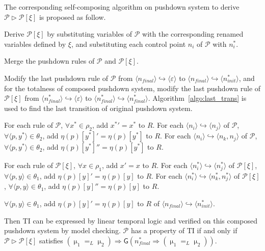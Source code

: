 \documentclass{llncs}
\begin{document}
The corresponding self-composing algorithm on pushdown system to
derive $\mathcal{P}\vartriangleright \mathcal{P}[\xi]$ is proposed
as follow.
\begin{compactenum}[1.]
\item Derive $\mathcal {P}[\xi]$ by substituting variables of $\mathcal {P}$ with the corresponding renamed
variables defined by $\xi$, and substituting each control point
$n_i$ of $\mathcal {P}$ with $n_i^*$.
\item Merge the pushdown rules of $\mathcal {P}$ and $\mathcal {P}[\xi]$.
\item Modify the last pushdown rule of $\mathcal {P}$ from
$\langle n_{final}\rangle \hookrightarrow \langle
\varepsilon\rangle$ to $\langle n_{final}\rangle \hookrightarrow
\langle n_{init}^*\rangle$, and for the totalness of composed
pushdown system, modify the last pushdown rule of $\mathcal{P}[\xi]$
from $\langle n_{final}^*\rangle \hookrightarrow
\langle\varepsilon\rangle$ to $\langle
n_{final}^*\rangle\hookrightarrow\langle n_{final}^*\rangle$.
Algorithm~\ref{algo:last_trans} is used to find the last transition
of original pushdown system.
\item For each rule of $\mathcal{P}$, $\forall x^*\in \rho_2$, add
${x^*}'=x^*$ to $R$. For each $\langle n_i\rangle \hookrightarrow
\langle n_j\rangle$ of $\mathcal{P}$, $\forall \langle p,y^*\rangle
\in \theta_2$, add $\eta(p)[y^*]'=\eta(p)[y^*]$ to $R$. For each
$\langle n_i\rangle \hookrightarrow \langle n_k,n_j\rangle$ of
$\mathcal{P}$, $\forall \langle p,y^*\rangle \in \theta_2$, add
$\eta(p)[y^*]''=\eta(p)[y^*]$ to $R$.
\item For each rule of $\mathcal{P}[\xi]$, $\forall x\in \rho_1$, add
$x'=x$ to $R$. For each $\langle n_i^*\rangle \hookrightarrow
\langle n_j^*\rangle$ of $\mathcal{P}[\xi]$, $\forall \langle
p,y\rangle \in \theta_1$, add $\eta(p)[y]'=\eta(p)[y]$ to $R$. For
each $\langle n_i^*\rangle \hookrightarrow \langle
n_k^*,n_j^*\rangle$ of $\mathcal{P}[\xi]$, $\forall \langle
p,y\rangle \in \theta_1$, add $\eta(p)[y]''=\eta(p)[y]$ to $R$.
\item $\forall \langle
p,y\rangle \in \theta_1$, add $\eta(p)[y]'=\eta(p)[y]$ to $R$ of
$\langle n_{final}\rangle \hookrightarrow \langle
n_{init}^*\rangle$.
\end{compactenum}
Then TI can be expressed by linear temporal logic and verified on
this composed pushdown system by model checking. $\mathcal {P}$ has
a property of TI if and only if $\mathcal {P}\vartriangleright
\mathcal {P}[\xi]$ satisfies $(\upmu_1 =_L \upmu_2)\Rightarrow
\textsf{G}(n_{final}^*\Rightarrow (\upmu_1 =_L \upmu_2))$.
\end{document}
